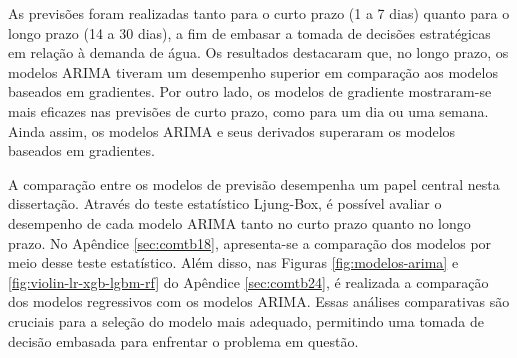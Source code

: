 As previsões foram realizadas tanto para o curto prazo (1 a 7 dias) quanto para o longo prazo (14 a 30 dias), a fim de embasar a tomada de decisões estratégicas em relação à demanda de água. Os resultados destacaram que, no longo prazo, os modelos ARIMA tiveram um desempenho superior em comparação aos modelos baseados em gradientes. Por outro lado, os modelos de gradiente mostraram-se mais eficazes nas previsões de curto prazo, como para um dia ou uma semana. Ainda assim, os modelos ARIMA e seus derivados superaram os modelos baseados em gradientes.

A comparação entre os modelos de previsão desempenha um papel central nesta dissertação. Através do teste estatístico Ljung-Box, é possível avaliar o desempenho de cada modelo ARIMA tanto no curto prazo quanto no longo prazo. No Apêndice \ref{sec:comtb18}, apresenta-se a comparação dos modelos por meio desse teste estatístico. Além disso, nas Figuras \ref{fig:modelos-arima} e \ref{fig:violin-lr-xgb-lgbm-rf} do Apêndice \ref{sec:comtb24}, é realizada a comparação dos modelos regressivos com os modelos ARIMA. Essas análises comparativas são cruciais para a seleção do modelo mais adequado, permitindo uma tomada de decisão embasada para enfrentar o problema em questão.
